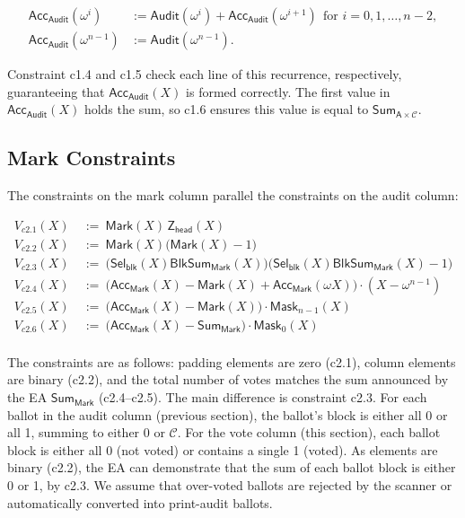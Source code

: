 $$
\begin{aligned}
\mathsf{Acc}_{\mathsf{Audit}}(\omega^{i}) &:= \mathsf{Audit}(\omega^{i}) + \mathsf{Acc}_{\mathsf{Audit}}(\omega^{i+1}) \ \ \text{for } i=0,1,\ldots,n-2,\\
\mathsf{Acc}_{\mathsf{Audit}}(\omega^{n-1}) &:= \mathsf{Audit}(\omega^{n-1}).
\end{aligned}
$$

 Constraint c1.4 and c1.5 check each line of this recurrence, respectively, guaranteeing that $\mathsf{Acc}_{\mathsf{Audit}}(X)$ is formed correctly. The first value in $\mathsf{Acc}_{\mathsf{Audit}}(X)$ holds the sum, so c1.6 ensures this value is equal to $\mathsf{Sum}_{\mathsf{A}\times\mathcal{C}}$. 

\subsection{Mark Constraints}
\label{sec:mark}

The constraints on the mark column parallel the constraints on the audit column:

\begin{mdframed}[linewidth=0.6pt,backgroundcolor=verylightpink,innerleftmargin=6pt,innerrightmargin=6pt,innertopmargin=4pt,innerbottommargin=4pt]
\[
\begin{aligned}
V_{c2.1}(X)\ &:=\ \mathsf{Mark}(X)\,\mathsf{Z}_{\mathsf{head}}(X)\\
V_{c2.2}(X)\ &:=\ \mathsf{Mark}(X)\bigl(\mathsf{Mark}(X)-1\bigr)\\
V_{c2.3}(X)\ &:=\ \bigl(\mathsf{Sel}_{\mathsf{blk}}(X)\mathsf{BlkSum}_{\mathsf{Mark}}(X)\bigr)\bigl(\mathsf{Sel}_{\mathsf{blk}}(X)\mathsf{BlkSum}_{\mathsf{Mark}}(X)-1\bigr)\\
V_{c2.4}(X)\ &:=\ \bigl(\mathsf{Acc}_{\mathsf{Mark}}(X)-\mathsf{Mark}(X)+\mathsf{Acc}_{\mathsf{Mark}}(\omega X)\bigr)\cdot(X-\omega^{n-1})\\
V_{c2.5}(X)\ &:=\ \bigl(\mathsf{Acc}_{\mathsf{Mark}}(X)-\mathsf{Mark}(X)\bigr)\cdot \mathsf{Mask}_{n-1}(X)\\
V_{c2.6}(X)\ &:=\ \bigl(\mathsf{Acc}_{\mathsf{Mark}}(X)-\mathsf{Sum}_{\mathsf{Mark}}\bigr)\cdot \mathsf{Mask}_{0}(X)\\
\end{aligned}
\]
\end{mdframed}

 The constraints are as follows: padding elements are zero (c2.1), column elements are binary (c2.2), and the total number of votes matches the sum announced by the EA $\mathsf{Sum}_{\mathsf{Mark}}$ (c2.4--c2.5). The main difference is constraint c2.3. For each ballot in the audit column (previous section), the ballot's block is either all 0 or all 1, summing to either 0 or $\mathcal{C}$. For the vote column (this section), each ballot block is either all 0 (not voted) or contains a single 1 (voted). As elements are binary (c2.2), the EA can demonstrate that the sum of each ballot block is either 0 or 1, by c2.3. We assume that over-voted ballots are rejected by the scanner or automatically converted into print-audit ballots.



